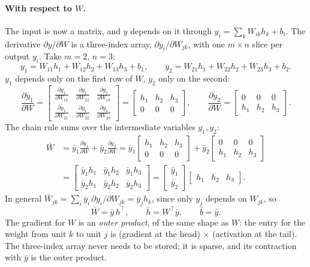 \begin{notechapter}
\paragraph{With respect to $W$.} The input is now a matrix, and $y$ depends on it through
$y_i = \sum_kW_{ik}h_k + b_i$. The derivative $\partial y/\partial W$ is a three-index array, $\partial y_i/\partial W_{jk}$, with one $m\times n$ slice
per output $y_i$. Take $m = 2$, $n = 3$:
\[
  y_1 = W_{11}h_1 + W_{12}h_2 + W_{13}h_3 + b_1,\qquad y_2 = W_{21}h_1 + W_{22}h_2 + W_{23}h_3 + b_2 .
\]
$y_1$ depends only on the first row of $W$, $y_2$ only on the second:
\[
  \frac{\partial y_1}{\partial W} = \begin{bmatrix}
    \frac{\partial y_1}{\partial W_{11}} & \frac{\partial y_1}{\partial W_{12}} & \frac{\partial y_1}{\partial W_{13}}\\[2pt]
    \frac{\partial y_1}{\partial W_{21}} & \frac{\partial y_1}{\partial W_{22}} & \frac{\partial y_1}{\partial W_{23}}\end{bmatrix}
  = \begin{bmatrix} h_1 & h_2 & h_3\\ 0 & 0 & 0\end{bmatrix},\qquad
  \frac{\partial y_2}{\partial W} = \begin{bmatrix} 0 & 0 & 0\\ h_1 & h_2 & h_3\end{bmatrix} .
\]
The chain rule sums over the intermediate variables $y_1, y_2$:
\begin{align*}
  \bar W &= \bar y_1\frac{\partial y_1}{\partial W} + \bar y_2\frac{\partial y_2}{\partial W}
  = \bar y_1\begin{bmatrix} h_1 & h_2 & h_3\\ 0 & 0 & 0\end{bmatrix}
  + \bar y_2\begin{bmatrix} 0 & 0 & 0\\ h_1 & h_2 & h_3\end{bmatrix}\\
  &= \begin{bmatrix}\bar y_1h_1 & \bar y_1h_2 & \bar y_1h_3\\ \bar y_2h_1 & \bar y_2h_2 & \bar y_2h_3\end{bmatrix}
  = \begin{bmatrix}\bar y_1\\ \bar y_2\end{bmatrix}\begin{bmatrix}h_1 & h_2 & h_3\end{bmatrix} .
\end{align*}
In general $\bar W_{jk} = \sum_i\bar y_i\,\partial y_i/\partial W_{jk} = \bar y_jh_k$, since only $y_j$ depends on $W_{jk}$, so
\[
  \boxed{\bar W = \bar y\,h^\top,\qquad\bar h = W^\top\bar y,\qquad\bar b = \bar y .}
\]
The gradient for $W$ is an \emph{outer product}, of the same shape as $W$: the entry for the weight
from unit $k$ to unit $j$ is (gradient at the head) $\times$ (activation at the tail). The
three-index array never needs to be stored; it is sparse, and its contraction with $\bar y$ is
the outer product.


\end{notechapter}

